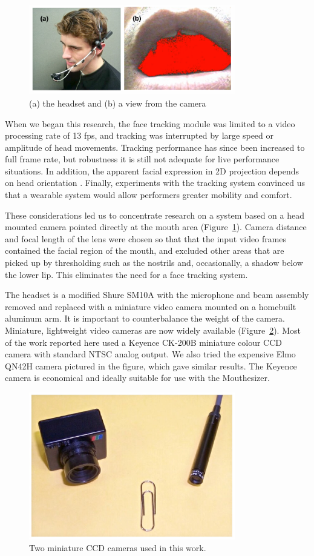 \begin{figure}[t]
\centering
\includegraphics[width=90mm]{lyons_fig2}
\caption{(a) the headset and (b) a view from the camera}
\label{lyons-fig:2} 
\end{figure}

When we began this research, the face tracking module was limited to a video processing rate of 13 fps, and tracking was interrupted by large speed or amplitude of head movements. Tracking performance has since been increased to full frame rate, but robustness it is still not adequate for live performance situations. In addition, the apparent facial expression in 2D projection depends on head orientation \cite{Lyons:2000}. Finally, experiments with the tracking system convinced us that a wearable system would allow performers greater mobility and comfort. 

These considerations led us to concentrate research on a system based on a head mounted camera pointed directly at the mouth area (Figure~\ref{lyons-fig:2}). Camera distance and focal length of the lens were chosen so that that the input video frames contained the facial region of the mouth, and excluded other areas that are picked up by  thresholding such as the nostrils and, occasionally, a shadow below the lower lip. This eliminates the need for a face tracking system. 

The headset is a modified Shure SM10A with the microphone and beam assembly removed and replaced with a miniature video camera mounted on a homebuilt aluminum arm. It is important to counterbalance the weight of the camera. Miniature, lightweight video cameras are now widely available (Figure~\ref{lyons-fig:3}). Most of the work reported here used a Keyence CK-200B miniature colour CCD camera with standard NTSC analog output. We also tried the expensive Elmo QN42H camera pictured in the figure, which gave similar results. The Keyence camera is economical and ideally suitable for use with the Mouthesizer. 

\begin{figure}[t]
\centering
\includegraphics[width=90mm]{lyons_fig3}
\caption{Two miniature CCD cameras used in this work.}
\label{lyons-fig:3} 
\end{figure}

